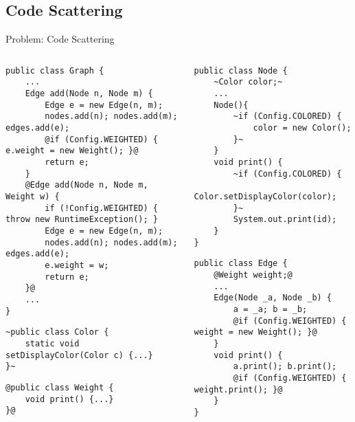 \subsection{Code Scattering}
\begin{frame}[fragile]{Problem: Code Scattering }
		\begin{columns}
\begin{tiny}
\begin{lstlisting}
public class Graph {
	...
	Edge add(Node n, Node m) {
		Edge e = new Edge(n, m);
		nodes.add(n); nodes.add(m); edges.add(e);
		@if (Config.WEIGHTED) { e.weight = new Weight(); }@
		return e;
	}
	@Edge add(Node n, Node m, Weight w) {
		if (!Config.WEIGHTED) { throw new RuntimeException(); }
		Edge e = new Edge(n, m);
		nodes.add(n); nodes.add(m); edges.add(e);
		e.weight = w;
		return e;
	}@
	...
}
\end{lstlisting}
\begin{lstlisting}
~public class Color {
	static void setDisplayColor(Color c) {...}
}~
\end{lstlisting}
\begin{lstlisting}
@public class Weight {
	void print() {...}
}@
\end{lstlisting}
\end{tiny}	
\begin{tiny}
\begin{lstlisting}
public class Node {
	~Color color;~
	...
	Node(){
		~if (Config.COLORED) { 
			color = new Color(); 
		}~
	}
	void print() {
		~if (Config.COLORED) { 
			Color.setDisplayColor(color); 
		}~
		System.out.print(id);
	}
}
\end{lstlisting}
\begin{lstlisting}
public class Edge {
	@Weight weight;@
	...
	Edge(Node _a, Node _b) {
		a = _a; b = _b;
		@if (Config.WEIGHTED) { weight = new Weight(); }@
	}
	void print() {
		a.print(); b.print();
		@if (Config.WEIGHTED) { weight.print(); }@
	}
}
\end{lstlisting}
\end{tiny}	
		\end{columns}
\end{frame}

